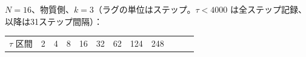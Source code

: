 \documentclass[
  10pt,
]{ltjsarticle}
\newcounter{none} %
\begin{document}
\(N=16\)、物質側、\(k=3\)（ラグの単位はステップ。\(\tau<4000\)
は全ステップ記録、以降は31ステップ間隔）：

{\def\LTcaptype{none} %
\begin{longtable}[]{@{}
  >{\raggedright\arraybackslash}p{}
  >{\raggedright\arraybackslash}p{}
  >{\raggedright\arraybackslash}p{}
  >{\raggedright\arraybackslash}p{}
  >{\raggedright\arraybackslash}p{}
  >{\raggedright\arraybackslash}p{}
  >{\raggedright\arraybackslash}p{}
  >{\raggedright\arraybackslash}p{}
  >{\raggedright\arraybackslash}p{}
  >{\raggedright\arraybackslash}p{}
  >{\raggedright\arraybackslash}p{}
  >{\raggedright\arraybackslash}p{}@{}}
\toprule\noalign{}
\begin{minipage}[b]{\linewidth}\raggedright
\(\tau\) 区間
\end{minipage} & \begin{minipage}[b]{\linewidth}\raggedright
2
\end{minipage} & \begin{minipage}[b]{\linewidth}\raggedright
4
\end{minipage} & \begin{minipage}[b]{\linewidth}\raggedright
8
\end{minipage} & \begin{minipage}[b]{\linewidth}\raggedright
16
\end{minipage} & \begin{minipage}[b]{\linewidth}\raggedright
32
\end{minipage} & \begin{minipage}[b]{\linewidth}\raggedright
62
\end{minipage} & \begin{minipage}[b]{\linewidth}\raggedright
124
\end{minipage} & \begin{minipage}[b]{\linewidth}\raggedright
248
\end{minipage} & \begin{minipage}[b]{\linewidth}\raggedright

\end{minipage}
\end{longtable}}
\end{document}
